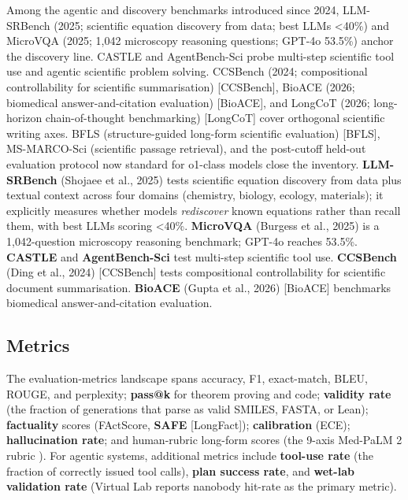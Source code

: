 \documentclass{article}
\begin{document}
Among the agentic and discovery benchmarks introduced since 2024, LLM-SRBench (2025; scientific equation discovery from data; best LLMs \textless40\%) \cite{shojaee2025llmsrbenchanewbenc} and MicroVQA (2025; 1,042 microscopy reasoning questions; GPT-4o 53.5\%) \cite{burgess2023microvqaamultimoda} anchor the discovery line. CASTLE and AgentBench-Sci probe multi-step scientific tool use and agentic scientific problem solving. CCSBench (2024; compositional controllability for scientific summarisation) {[}CCSBench{]}, BioACE (2026; biomedical answer-and-citation evaluation) {[}BioACE{]}, and LongCoT (2026; long-horizon chain-of-thought benchmarking) {[}LongCoT{]} cover orthogonal scientific writing axes. BFLS (structure-guided long-form scientific evaluation) {[}BFLS{]}, MS-MARCO-Sci (scientific passage retrieval), and the post-cutoff held-out evaluation protocol now standard for o1-class models close the inventory. \textbf{LLM-SRBench} (Shojaee et al., 2025) \cite{shojaee2025llmsrbenchanewbenc} tests scientific equation discovery from data plus textual context across four domains (chemistry, biology, ecology, materials); it explicitly measures whether models \emph{rediscover} known equations rather than recall them, with best LLMs scoring \textless40\%. \textbf{MicroVQA} (Burgess et al., 2025) \cite{burgess2023microvqaamultimoda} is a 1,042-question microscopy reasoning benchmark; GPT-4o reaches 53.5\%. \textbf{CASTLE} and \textbf{AgentBench-Sci} test multi-step scientific tool use. \textbf{CCSBench} (Ding et al., 2024) {[}CCSBench{]} tests compositional controllability for scientific document summarisation. \textbf{BioACE} (Gupta et al., 2026) {[}BioACE{]} benchmarks biomedical answer-and-citation evaluation.

\subsection{Metrics}\label{metrics}

The evaluation-metrics landscape spans accuracy, F1, exact-match, BLEU, ROUGE, and perplexity; \textbf{pass@k} for theorem proving and code; \textbf{validity rate} (the fraction of generations that parse as valid SMILES, FASTA, or Lean); \textbf{factuality} scores (FActScore, \textbf{SAFE} {[}LongFact{]}); \textbf{calibration} (ECE); \textbf{hallucination rate}; and human-rubric long-form scores (the 9-axis Med-PaLM 2 rubric \cite{singhal2025towardexpertlevelm}). For agentic systems, additional metrics include \textbf{tool-use rate} (the fraction of correctly issued tool calls), \textbf{plan success rate}, and \textbf{wet-lab validation rate} (Virtual Lab \cite{swanson2024thevirtuallabaiage} reports nanobody hit-rate as the primary metric).
\end{document}

